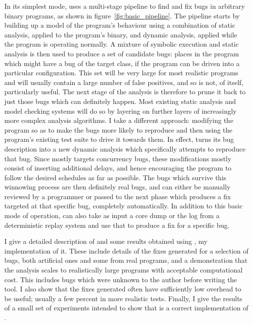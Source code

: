 In its simplest mode, \technique{} uses a multi-stage pipeline to find
and fix bugs in arbitrary binary programs, as shown in
figure~\ref{fig:basic_pipeline}.  The pipeline starts by building up a
model of the program's behaviour using a combination of static
analysis, applied to the program's binary, and dynamic analysis,
applied while the program is operating normally.  A mixture of
symbolic execution and static analysis is then used to produce a set
of candidate bugs: places in the program which might have a bug of the
target class, if the program can be driven into a particular
configuration.  This set will be very large for most realistic
programs and will usually contain a large number of false positives,
and so is not, of itself, particularly useful.  The next stage of the
analysis is therefore to prune it back to just those bugs which can
definitely happen.  Most existing static analysis and model checking
systems will do so by layering on further layers of increasingly more
complex analysis algorithms.  I take a different approach: modifying
the program so as to make the bugs more likely to reproduce and then
using the program's existing test suite to drive it towards them.  In
effect, \technique{} turns its bug description into a new dynamic
analysis which specifically attempts to reproduce that bug.  Since
\technique{} mostly targets concurrency bugs, these modifications mostly
consist of inserting additional delays, and hence encouraging the
program to follow the desired schedules as far as possible.  The bugs
which survive this winnowing process are then definitely real bugs,
and can either be manually reviewed by a programmer or passed to the
next phase which produces a fix targeted at that specific bug,
completely automatically.  In addition to this basic mode of
operation, \technique{} can also take as input a core dump or the log
from a deterministic replay system and use that to produce a fix for a
specific bug.

I give a detailed description of \technique{} and some results obtained
using \implementation, my implementation of it.  These include details
of the fixes generated for a selection of bugs, both artificial ones
and some from real programs, and a demonstration that the analysis
scales to realistically large programs with acceptable computational
cost.  This includes bugs which were unknown to the author before
writing the tool.  I also show that the fixes generated
often have sufficiently low overhead to be useful; usually a few
percent in more realistic tests.  Finally, I give the results of a
small set of experiments intended to show that \implementation{} is a
correct implementation of \technique{}.

